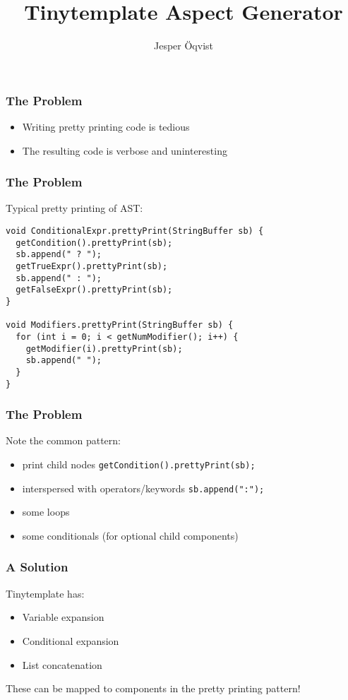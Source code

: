 \documentclass[a4paper,12pt,presentation]{beamer}
\title[aspectgen]{Tinytemplate Aspect Generator}
\author{Jesper Öqvist}
\institute{Department of Computer Science\\
Lund University}
\begin{document}
\begin{frame}
    \titlepage
\end{frame}


\begin{frame}[fragile]
    \frametitle{The Problem}
    \begin{itemize}
        \item Writing pretty printing code is tedious
        \item The resulting code is verbose and uninteresting
    \end{itemize}
\end{frame}

\begin{frame}[fragile]
    \frametitle{The Problem}
    Typical pretty printing of AST:

    \footnotesize\begin{verbatim}
void ConditionalExpr.prettyPrint(StringBuffer sb) {
  getCondition().prettyPrint(sb);
  sb.append(" ? ");
  getTrueExpr().prettyPrint(sb);
  sb.append(" : ");
  getFalseExpr().prettyPrint(sb);
}

void Modifiers.prettyPrint(StringBuffer sb) {
  for (int i = 0; i < getNumModifier(); i++) {
    getModifier(i).prettyPrint(sb);
    sb.append(" ");
  }
}
    \end{verbatim}\normalsize
\end{frame}

\begin{frame}[fragile]
    \frametitle{The Problem}
    Note the common pattern:
    
    \begin{itemize}
        \item print child nodes \verb'getCondition().prettyPrint(sb);'
        \item interspersed with operators/keywords \verb'sb.append(":");'
        \item some loops
        \item some conditionals (for optional child components)
    \end{itemize}
\end{frame}

\begin{frame}
    \frametitle{A Solution}
    Tinytemplate has:

    \begin{itemize}

        \item Variable expansion 

        \item Conditional expansion

        \item List concatenation

    \end{itemize}

    These can be mapped to components in the pretty printing pattern!
\end{frame}
\end{document}
